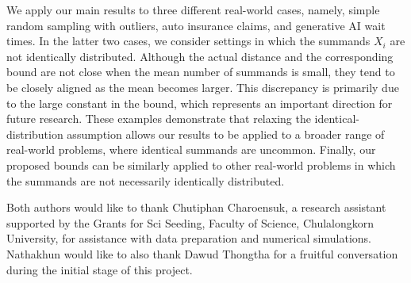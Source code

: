 \documentclass[pdflatex,sn-mathphys-ay]{sn-jnl}
\theoremstyle{thmstyleone}%
\theoremstyle{thmstyletwo}%
\theoremstyle{thmstylethree}%
\begin{document}
We apply our main results to three different real-world cases, namely, simple random sampling with outliers, auto insurance claims, and generative AI wait times. In the latter two cases, we consider settings in which the summands $X_i$ are not identically distributed. Although the actual distance and the corresponding bound are not close when the mean number of summands is small, they tend to be closely aligned as the mean becomes larger. This discrepancy is primarily due to the large constant in the bound, which represents an important direction for future research. These examples demonstrate that relaxing the identical-distribution assumption allows our results to be applied to a broader range of real-world problems, where identical summands are uncommon. Finally, our proposed bounds can be similarly applied to other real-world problems in which the summands are not necessarily identically distributed.

\backmatter


Both authors would like to thank Chutiphan Charoensuk, a research assistant supported by the Grants for Sci Seeding, Faculty of Science, Chulalongkorn University, for assistance with data preparation and numerical simulations. Nathakhun would like to also thank Dawud Thongtha for a fruitful conversation during the initial stage of this project.


\end{document}
